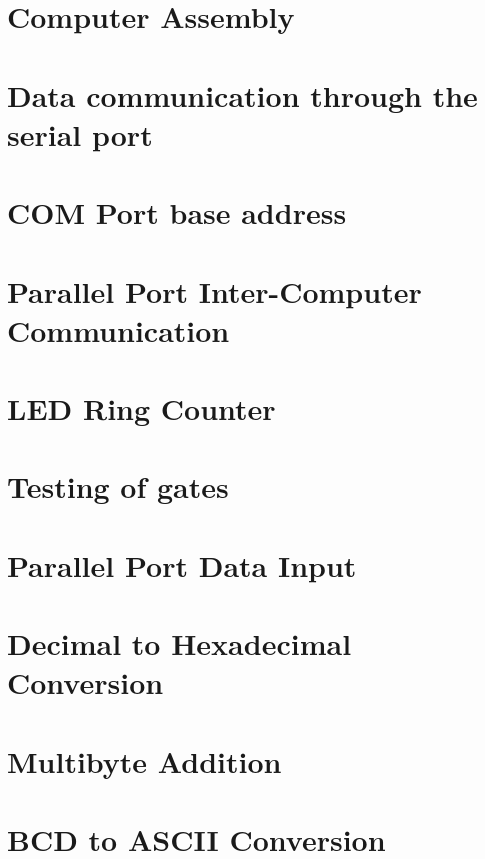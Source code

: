 \documentclass[12pt]{report}
\begin{document}
  \chapter{ Computer Assembly}
  
  
  \chapter{ Data communication through the serial port}
  
  
  
  \chapter{ COM Port base address}
  
    
  \chapter{ Parallel Port Inter-Computer Communication}
  
      
  \chapter{ LED Ring Counter}
  
  
   \chapter{ Testing of gates}
   
   
     \chapter{ Parallel Port Data Input}
     
     
  \chapter{ Decimal to Hexadecimal Conversion}
  
  

  \chapter{ Multibyte Addition}
  
  
  \chapter{ BCD to ASCII Conversion}
  
  
\end{document}
